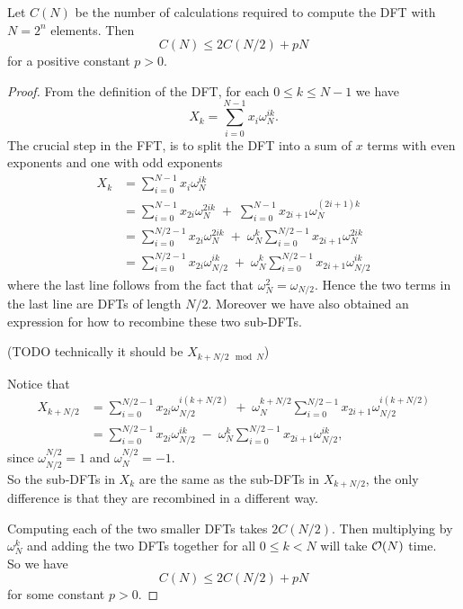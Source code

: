 \begin{lemma}
    Let $C(N)$ be the number of calculations required to compute the DFT with $N = 2^n$ elements. Then
    \begin{equation}
        C(N) \le 2 C(N/2) + pN \label{eq:fftlem}
    \end{equation}
    for a positive constant $p > 0$.
\end{lemma}

\begin{proof}
From the definition of the DFT, for each $0 \le k \le N-1$ we have
\[
    X_k = \sum^{N-1}_{i=0}x_i\omega_N^{ik}.
\]
The crucial step in the FFT, is to split the DFT into a sum of $x$ terms with even exponents and one with odd exponents
\begin{align}
    X_k
    &= \sum^{N-1}_{i=0}x_i\omega_N^{ik} \nonumber\\
    &= \sum^{N-1}_{i=0}x_{2i}\omega_N^{2ik} \;+\; \sum^{N-1}_{i=0}x_{2i+1} \omega_N^{(2i+1)k} \nonumber\\
    &= \sum^{N/2-1}_{i=0}x_{2i}\omega_N^{2ik} \;+\; \omega_N^k \sum^{N/2-1}_{i=0}x_{2i+1}\omega_N^{2ik}\\
    &= \sum^{N/2-1}_{i=0}x_{2i}\omega_{N/2}^{ik} \;+\; \omega_N^k \sum^{N/2-1}_{i=0}x_{2i+1}\omega_{N/2}^{ik} \label{eq:keystep}
\end{align}
where the last line follows from the fact that $\omega_N^2 = \omega_{N/2}$. Hence the two terms in the last line are DFTs of length $N/2$. Moreover we have also obtained an expression for how to recombine these two sub-DFTs.

(TODO technically it should be $X_{k + N/2 \mod N}$)

Notice that
\begin{align*}
    X_{k + N/2}
    &= \sum^{N/2-1}_{i=0}x_{2i}\omega_{N/2}^{i(k + N/2)} \;+\; \omega_N^{k+ N/2} \sum^{N/2-1}_{i=0}x_{2i+1}\omega_{N/2}^{i(k + N/2)}\\
    &= \sum^{N/2-1}_{i=0}x_{2i}\omega_{N/2}^{ik} \;-\; \omega_N^k \sum^{N/2-1}_{i=0}x_{2i+1}\omega_{N/2}^{ik},
\end{align*}
since $\omega_{N/2}^{N/2} = 1$ and $\omega_N^{N/2} = -1$.\\
So the sub-DFTs in $X_k$ are the same as the sub-DFTs in $X_{k + N/2}$, the only difference is that they are recombined in a different way.

Computing each of the two smaller DFTs takes $2C(N/2)$. Then multiplying by $\omega^k_N$ and adding the two DFTs together for all $0 \leq k < N$ will take $\mathcal O(N)$ time. \\
So we have
\[
    C(N) \le 2 C(N/2) + pN
\]
for some constant $p > 0$.
\end{proof}

